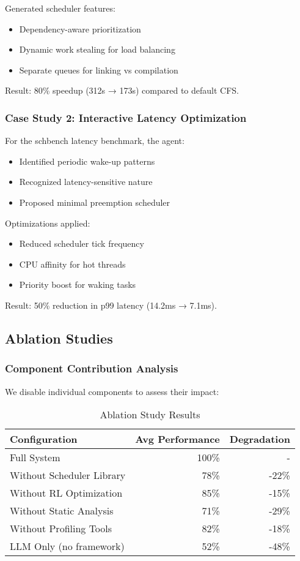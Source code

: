 Generated scheduler features:
\begin{itemize}
\item Dependency-aware prioritization
\item Dynamic work stealing for load balancing
\item Separate queues for linking vs compilation
\end{itemize}

Result: 80\% speedup (312s → 173s) compared to default CFS.

\subsubsection{Case Study 2: Interactive Latency Optimization}

For the schbench latency benchmark, the agent:
\begin{itemize}
\item Identified periodic wake-up patterns
\item Recognized latency-sensitive nature
\item Proposed minimal preemption scheduler
\end{itemize}

Optimizations applied:
\begin{itemize}
\item Reduced scheduler tick frequency
\item CPU affinity for hot threads
\item Priority boost for waking tasks
\end{itemize}

Result: 50\% reduction in p99 latency (14.2ms → 7.1ms).

\subsection{Ablation Studies}

\subsubsection{Component Contribution Analysis}

We disable individual components to assess their impact:

\begin{table}[h]
\caption{Ablation Study Results}
\label{tab:ablation}
\begin{tabular}{lrr}
\toprule
Configuration & Avg Performance & Degradation \\
\midrule
Full System & 100\% & - \\
Without Scheduler Library & 78\% & -22\% \\
Without RL Optimization & 85\% & -15\% \\
Without Static Analysis & 71\% & -29\% \\
Without Profiling Tools & 82\% & -18\% \\
LLM Only (no framework) & 52\% & -48\% \\
\bottomrule
\end{tabular}
\end{table}

